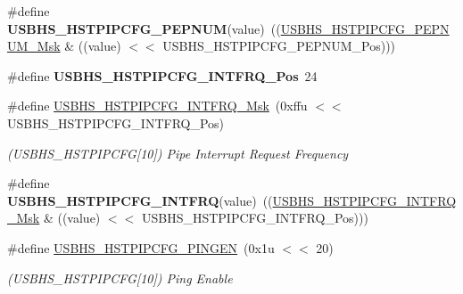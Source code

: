 \begin{DoxyCompactItemize}
\mbox{\label{group__SAMV71__USBHS_ga747426e0b642ef7265ed29f97289fe1e}} 
\#define {\bfseries U\+S\+B\+H\+S\+\_\+\+H\+S\+T\+P\+I\+P\+C\+F\+G\+\_\+\+P\+E\+P\+N\+UM}(value)~((\mbox{\hyperlink{group__SAMV71__USBHS_gae4c427ae7b00860d3e38d2fb3a3b1cd5}{U\+S\+B\+H\+S\+\_\+\+H\+S\+T\+P\+I\+P\+C\+F\+G\+\_\+\+P\+E\+P\+N\+U\+M\+\_\+\+Msk}} \& ((value) $<$$<$ U\+S\+B\+H\+S\+\_\+\+H\+S\+T\+P\+I\+P\+C\+F\+G\+\_\+\+P\+E\+P\+N\+U\+M\+\_\+\+Pos)))
\item 
\mbox{\label{group__SAMV71__USBHS_ga23bd8cae85e668996cae3c7113652b35}} 
\#define {\bfseries U\+S\+B\+H\+S\+\_\+\+H\+S\+T\+P\+I\+P\+C\+F\+G\+\_\+\+I\+N\+T\+F\+R\+Q\+\_\+\+Pos}~24
\item 
\mbox{\label{group__SAMV71__USBHS_ga0861796b9d288b3bb1aab1e85fafec77}} 
\#define \mbox{\hyperlink{group__SAMV71__USBHS_ga0861796b9d288b3bb1aab1e85fafec77}{U\+S\+B\+H\+S\+\_\+\+H\+S\+T\+P\+I\+P\+C\+F\+G\+\_\+\+I\+N\+T\+F\+R\+Q\+\_\+\+Msk}}~(0xffu $<$$<$ U\+S\+B\+H\+S\+\_\+\+H\+S\+T\+P\+I\+P\+C\+F\+G\+\_\+\+I\+N\+T\+F\+R\+Q\+\_\+\+Pos)
\begin{DoxyCompactList}\small\item\em (U\+S\+B\+H\+S\+\_\+\+H\+S\+T\+P\+I\+P\+C\+FG\mbox{[}10\mbox{]}) Pipe Interrupt Request Frequency \end{DoxyCompactList}\item 
\mbox{\label{group__SAMV71__USBHS_ga90973477f99168dd1b9b62c671c5ae2b}} 
\#define {\bfseries U\+S\+B\+H\+S\+\_\+\+H\+S\+T\+P\+I\+P\+C\+F\+G\+\_\+\+I\+N\+T\+F\+RQ}(value)~((\mbox{\hyperlink{group__SAMV71__USBHS_ga0861796b9d288b3bb1aab1e85fafec77}{U\+S\+B\+H\+S\+\_\+\+H\+S\+T\+P\+I\+P\+C\+F\+G\+\_\+\+I\+N\+T\+F\+R\+Q\+\_\+\+Msk}} \& ((value) $<$$<$ U\+S\+B\+H\+S\+\_\+\+H\+S\+T\+P\+I\+P\+C\+F\+G\+\_\+\+I\+N\+T\+F\+R\+Q\+\_\+\+Pos)))
\item 
\mbox{\label{group__SAMV71__USBHS_gaf0809494feabaf66ffe5b26414f8fd1f}} 
\#define \mbox{\hyperlink{group__SAMV71__USBHS_gaf0809494feabaf66ffe5b26414f8fd1f}{U\+S\+B\+H\+S\+\_\+\+H\+S\+T\+P\+I\+P\+C\+F\+G\+\_\+\+P\+I\+N\+G\+EN}}~(0x1u $<$$<$ 20)
\begin{DoxyCompactList}\small\item\em (U\+S\+B\+H\+S\+\_\+\+H\+S\+T\+P\+I\+P\+C\+FG\mbox{[}10\mbox{]}) Ping Enable \end{DoxyCompactList}\item 

\end{DoxyCompactItemize}
